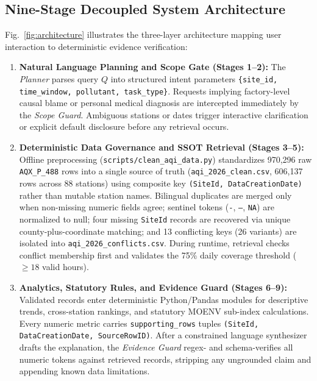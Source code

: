 \documentclass[conference]{IEEEtran}
\begin{document}
\subsection{Nine-Stage Decoupled System Architecture}
Fig.~\ref{fig:architecture} illustrates the three-layer architecture mapping user interaction to deterministic evidence verification:
\begin{enumerate}
    \item \textbf{Natural Language Planning and Scope Gate (Stages 1--2):} The \emph{Planner} parses query $Q$ into structured intent parameters \texttt{\{site\_id, time\_window, pollutant, task\_type\}}. Requests implying factory-level causal blame or personal medical diagnosis are intercepted immediately by the \emph{Scope Guard}. Ambiguous stations or dates trigger interactive clarification or explicit default disclosure before any retrieval occurs.
    \item \textbf{Deterministic Data Governance and SSOT Retrieval (Stages 3--5):} Offline preprocessing (\texttt{scripts/clean\_aqi\_data.py}) standardizes 970,296 raw \texttt{AQX\_P\_488} rows into a single source of truth (\texttt{aqi\_2026\_clean.csv}, 606,137 rows across 88 stations) using composite key \texttt{(SiteId, DataCreationDate)} rather than mutable station names. Bilingual duplicates are merged only when non-missing numeric fields agree; sentinel tokens (\texttt{-}, \texttt{--}, \texttt{NA}) are normalized to null; four missing \texttt{SiteId} records are recovered via unique county-plus-coordinate matching; and 13 conflicting keys (26 variants) are isolated into \texttt{aqi\_2026\_conflicts.csv}. During runtime, retrieval checks conflict membership first and validates the 75\% daily coverage threshold ($\ge 18$ valid hours).
    \item \textbf{Analytics, Statutory Rules, and Evidence Guard (Stages 6--9):} Validated records enter deterministic Python/Pandas modules for descriptive trends, cross-station rankings, and statutory MOENV sub-index calculations. Every numeric metric carries \texttt{supporting\_rows} tuples \texttt{(SiteId, DataCreationDate, SourceRowID)}. After a constrained language synthesizer drafts the explanation, the \emph{Evidence Guard} regex- and schema-verifies all numeric tokens against retrieved records, stripping any ungrounded claim and appending known data limitations.
\end{enumerate}
\end{document}
